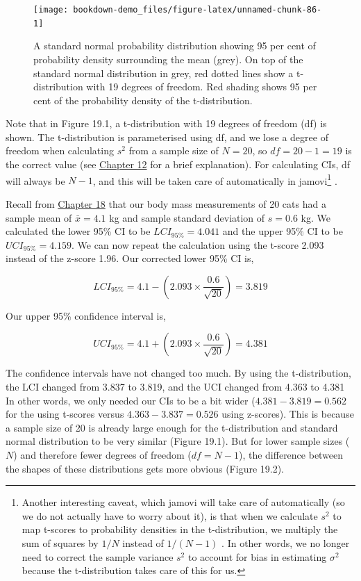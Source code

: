 \documentclass[
]{scrbook}
\begin{document}
\begin{figure}
\texttt{[image: bookdown-demo\_files/figure-latex/unnamed-chunk-86-1]} \caption{A standard normal probability distribution showing 95 per cent of probability density surrounding the mean (grey). On top of the standard normal distribution in grey, red dotted lines show a t-distribution with 19 degrees of freedom. Red shading shows 95 per cent of the probability density of the t-distribution.}\label{fig:unnamed-chunk-86}
\end{figure}

Note that in Figure 19.1, a t-distribution with 19 degrees of freedom (df) is shown.
The t-distribution is parameterised using df, and we lose a degree of freedom when calculating \(s^{2}\) from a sample size of \(N = 20\), so \(df = 20 - 1 = 19\) is the correct value (see \protect\hyperlink{Chapter_12}{Chapter 12} for a brief explanation).
For calculating CIs, df will always be \(N - 1\), and this will be taken care of automatically in jamovi\footnote{Another interesting caveat, which jamovi will take care of automatically (so we do not actually have to worry about it), is that when we calculate \(s^{2}\) to map t-scores to probability densities in the t-distribution, we multiply the sum of squares by \(1/N\) instead of \(1/(N-1)\) \citep{Sokal1995}. In other words, we no longer need to correct the sample variance \(s^{2}\) to account for bias in estimating \(\sigma^{2}\) because the t-distribution takes care of this for us.} \citep{Jamovi2022}.

Recall from \protect\hyperlink{Chapter_18}{Chapter 18} that our body mass measurements of 20 cats had a sample mean of \(\bar{x} = 4.1\) kg and sample standard deviation of \(s = 0.6\) kg. We calculated the lower 95\% CI to be \(LCI_{95\%} = 4.041\) and the upper 95\% CI to be \(UCI_{95\%} = 4.159\). We can now repeat the calculation using the t-score 2.093 instead of the z-score 1.96.
Our corrected lower 95\% CI is,

\[LCI_{95\%} = 4.1 - \left(2.093 \times \frac{0.6}{\sqrt{20}}\right) = 3.819\]

Our upper 95\% confidence interval is,

\[UCI_{95\%} = 4.1 + \left(2.093 \times \frac{0.6}{\sqrt{20}}\right) = 4.381\]

The confidence intervals have not changed too much.
By using the t-distribution, the LCI changed from 3.837 to 3.819, and the UCI changed from 4.363 to 4.381
In other words, we only needed our CIs to be a bit wider (\(4.381 - 3.819 = 0.562\) for the using t-scores versus \(4.363 - 3.837 = 0.526\) using z-scores).
This is because a sample size of 20 is already large enough for the t-distribution and standard normal distribution to be very similar (Figure 19.1).
But for lower sample sizes (\(N\)) and therefore fewer degrees of freedom (\(df = N - 1\)), the difference between the shapes of these distributions gets more obvious (Figure 19.2).
\end{document}

